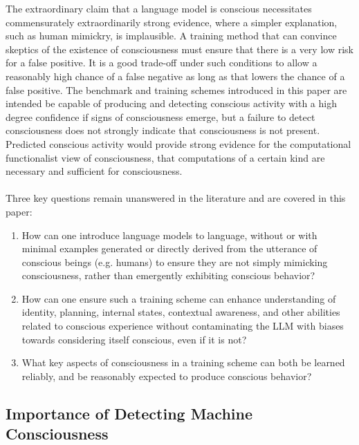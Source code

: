 \documentclass{article}
\begin{document}
The extraordinary claim that a language model is conscious necessitates commensurately extraordinarily strong evidence, where a simpler explanation, such as human mimickry, is implausible. A training method that can convince skeptics of the existence of consciousness must ensure that there is a very low risk for a false positive. It is a good trade-off under such conditions to allow a reasonably high chance of a false negative as long as that lowers the chance of a false positive. The benchmark and training schemes introduced in this paper are intended be capable of producing and detecting conscious activity with a high degree confidence if signs of consciousness emerge, but a failure to detect consciousness does not strongly indicate that consciousness is not present. Predicted conscious activity would provide strong evidence for the computational functionalist view of consciousness, that computations of a certain kind are necessary and sufficient for consciousness.\\ \\
Three key questions remain unanswered in the literature and are covered in this paper:
\begin{enumerate}
    \item How can one introduce language models to language, without or with minimal examples generated or directly derived from the utterance of conscious beings (e.g. humans) to ensure they are not simply mimicking consciousness, rather than emergently exhibiting conscious behavior?
    \item How can one ensure such a training scheme can enhance understanding of identity, planning, internal states, contextual awareness, and other abilities related to conscious experience without contaminating the LLM with biases towards considering itself conscious, even if it is not?
    \item What key aspects of consciousness in a training scheme can both be learned reliably, and be reasonably expected to produce conscious behavior?
\end{enumerate}

\subsection{Importance of Detecting Machine Consciousness}
\end{document}
